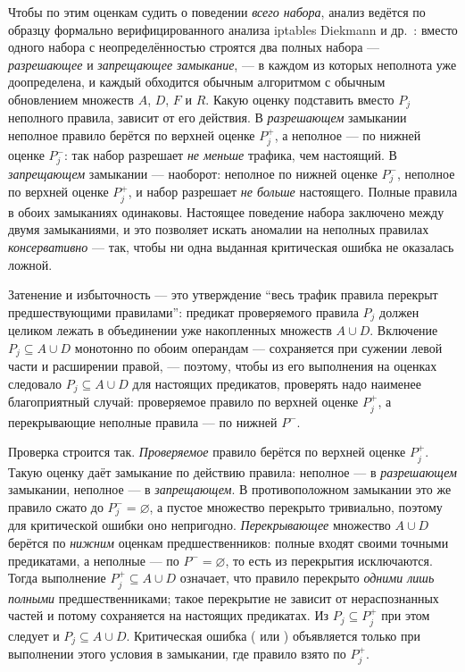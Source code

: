 Чтобы по этим оценкам судить о поведении \emph{всего набора}, анализ ведётся по образцу формально верифицированного анализа iptables Diekmann и др.~\cite{diekmann2018verified}: вместо одного набора с неопределённостью строятся два полных набора --- \emph{разрешающее} и \emph{запрещающее замыкание}, --- в каждом из которых неполнота уже доопределена, и каждый обходится обычным алгоритмом с обычным обновлением множеств $A$, $D$, $F$ и $R$. Какую оценку подставить вместо $P_j$ неполного правила, зависит от его действия. В \emph{разрешающем} замыкании неполное правило  берётся по верхней оценке $P_j^+$, а неполное  --- по нижней оценке $P_j^-$: так набор разрешает \emph{не меньше} трафика, чем настоящий. В \emph{запрещающем} замыкании --- наоборот: неполное  по нижней оценке $P_j^-$, неполное  по верхней оценке $P_j^+$, и набор разрешает \emph{не больше} настоящего. Полные правила в обоих замыканиях одинаковы. Настоящее поведение набора заключено между двумя замыканиями, и это позволяет искать аномалии на неполных правилах \emph{консервативно} --- так, чтобы ни одна выданная критическая ошибка не оказалась ложной.

Затенение и избыточность --- это утверждение ``весь трафик правила перекрыт предшествующими правилами'': предикат проверяемого правила $P_j$ должен целиком лежать в объединении уже накопленных множеств $A \cup D$. Включение $P_j \subseteq A \cup D$ монотонно по обоим операндам --- сохраняется при сужении левой части и расширении правой, --- поэтому, чтобы из его выполнения на оценках следовало $P_j \subseteq A \cup D$ для настоящих предикатов, проверять надо наименее благоприятный случай: проверяемое правило по верхней оценке $P_j^+$, а перекрывающие неполные правила --- по нижней $P^-$.

Проверка строится так. \emph{Проверяемое} правило берётся по верхней оценке $P_j^+$. Такую оценку даёт замыкание по действию правила: неполное  --- в \emph{разрешающем} замыкании, неполное  --- в \emph{запрещающем}. В противоположном замыкании это же правило сжато до $P_j^- = \varnothing$, а пустое множество перекрыто тривиально, поэтому для критической ошибки оно непригодно. \emph{Перекрывающее} множество $A \cup D$ берётся по \emph{нижним} оценкам предшественников: полные входят своими точными предикатами, а неполные --- по $P^- = \varnothing$, то есть из перекрытия исключаются. Тогда выполнение $P_j^+ \subseteq A \cup D$ означает, что правило перекрыто \emph{одними лишь полными} предшественниками; такое перекрытие не зависит от нераспознанных частей и потому сохраняется на настоящих предикатах. Из $P_j \subseteq P_j^+$ при этом следует и $P_j \subseteq A \cup D$. Критическая ошибка ( или ) объявляется только при выполнении этого условия в замыкании, где правило взято по $P_j^+$.

